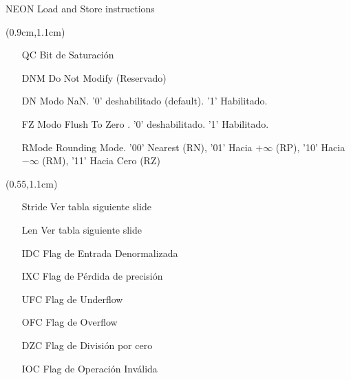 \begin{frame}[fragile]{NEON Load and Store instructions}
 \begin{textblock*}{0.45\textwidth}(0.9cm,1.1cm)
   \begin{itemize}\justifying \parskip 0.2cm
   \item [QC] Bit de Saturación
   \item [DNM] Do Not Modify (Reservado)
   \item [DN] Modo NaN. '0' deshabilitado (default). '1' Habilitado.
   \item [FZ] Modo Flush To Zero . '0' deshabilitado. '1' Habilitado.
   \item [RMode] Rounding Mode. '00' Nearest (RN), '01' Hacia $+\infty $ (RP), '10' Hacia $-\infty $ (RM), '11' Hacia Cero (RZ)
  \end{itemize}
 \end{textblock*}
 \begin{textblock*}{0.45\textwidth}(0.55\textwidth,1.1cm)
  \begin{itemize}\justifying \parskip 0.2cm
   \item [Stride] Ver tabla siguiente slide
   \item [Len] Ver tabla siguiente slide
   \item [IDC] Flag de Entrada Denormalizada
   \item [IXC] Flag de Pérdida de precisión
   \item [UFC] Flag de Underflow
   \item [OFC] Flag de Overflow
   \item [DZC] Flag de División por cero
   \item [IOC] Flag de Operación Inválida
  \end{itemize}
 \end{textblock*}
\end{frame}

\renewcommand\theadalign{bc}
\renewcommand\theadfont{\bfseries}

